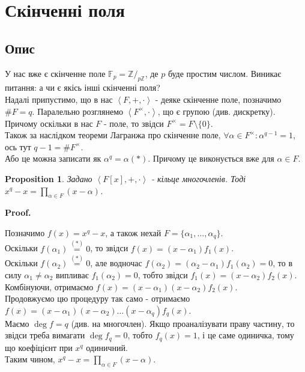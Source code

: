 \documentclass[a4paper, 14pt]{extarticle}
\makeatletter
\theoremstyle{theoremdd}
\theoremstyle{theoremdd}
\theoremstyle{theoremdd}
\theoremstyle{theoremdd}
\theoremstyle{theoremdd}
\newtheorem{proposition}[theorem]{Proposition}
\theoremstyle{theoremdd}
\theoremstyle{theoremdd}
\theoremstyle{theoremdd}
\def\qed{$\blacksquare$}
\renewenvironment{proof}[1][Proof.\\]{\par
\pushQED{\hfill \qed}%
\normalfont \topsep6\p@\@plus6\p@\relax
\trivlist
\item\relax
{\bfseries
#1\@addpunct{.}}\hspace\labelsep\ignorespaces
}{%
\popQED\endtrivlist\@endpefalse
}
\makeatother
\begin{document}
\section{Скінченні поля}
\subsection{Опис}
У нас вже є скінченне поле $\mathbb{F}_p = \mathbb{Z}/_{p \mathbb{Z}}$, де $p$ буде простим числом. Виникає питання: а чи є якісь інші скінченні поля?
\bigskip \\
Надалі припустимо, що в нас $\left< F, +, \cdot \right>$ - деяке скінченне поле, позначимо $\# F = q$. Паралельно розглянемо $\left< F^\times, \cdot \right>$, що є групою (див. дискретку). Причому оскільки в нас $F$ - поле, то звідси $F^\times = F \setminus \{0\}$.\\
Також за наслідком теореми Лагранжа про скінченне поле, $\forall \alpha \in F^\times: \alpha^{q-1} = 1$, ось тут $q-1 = \# F^\times$.\\
Або це можна записати як $\alpha^q = \alpha (*)$. Причому це виконується вже для $\alpha \in F$.

\begin{proposition}
Задано $\left< F[x], + ,\cdot \right>$ - кільце многочленів. Тоді\\
$x^q - x = \displaystyle\prod_{\alpha \in F} (x-\alpha)$.
\end{proposition}

\begin{proof}
Позначимо $f(x) = x^q - x$, а також нехай $F = \{ \alpha_1,\dots,\alpha_q \}$.\\
Оскільки $f(\alpha_1) \overset{(*)}{=} 0$, то звідси $f(x) = (x-\alpha_1)f_1(x)$.\\
Оскільки $f(\alpha_2) \overset{(*)}{=} 0$, але водночас $f(\alpha_2) = (\alpha_2-\alpha_1) f_1(\alpha_2) = 0$, то в силу $\alpha_1 \neq \alpha_2$ випливає $f_1(\alpha_2) = 0$, тобто звідси $f_1(x) = (x-\alpha_2)f_2(x)$.\\
Комбінуючи, отримаємо $f(x) = (x-\alpha_1)(x-\alpha_2) f_2(x)$.\\
Продовжуємо цю процедуру так само - отримаємо $f(x) = (x-\alpha_1)(x-\alpha_2) \dots (x-\alpha_q) f_q(x)$.\\
Маємо $\deg f = q$ (див. на многочлен). Якщо проаналізувати праву частину, то звідси треба вимагати $\deg f_q = 0$, тобто $f_q(x) = 1$, і це саме одиничка, тому що коефіцієнт при $x^q$ одиничний.\\
Таким чином, $x^q - x = \displaystyle\prod_{\alpha \in F} (x-\alpha)$.
\end{proof}
\end{document}
